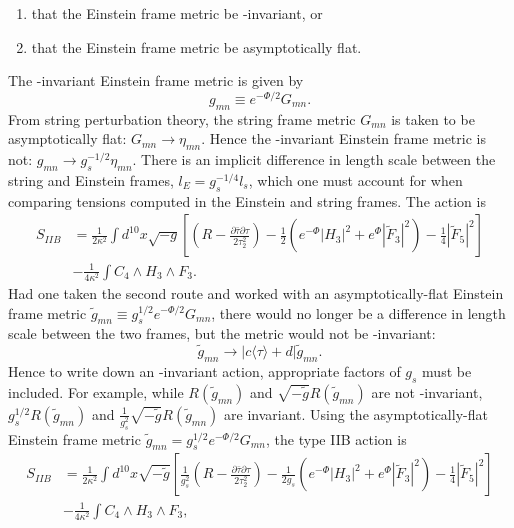 \begin{enumerate}
    \item that the Einstein frame metric be \SLR{}-invariant, or
    \item that the Einstein frame metric be asymptotically flat.
\end{enumerate}
The \SLR{}-invariant Einstein frame metric is given by
\begin{equation}
g_{mn} \equiv e^{-\Phi/2}G_{mn}.
\label{sl2r invariant Einstein frame metric}
\end{equation}
From string perturbation theory, the string frame metric $G_{mn}$ is taken to be asymptotically flat: $G_{mn} \to \eta_{mn}$. Hence the \SLR{}-invariant Einstein frame metric is not: $g_{mn} \to g_s^{-1/2}\eta_{mn}$.
There is an implicit difference in length scale between the string and Einstein frames, $l_E = g_s^{-1/4}l_s$, which one must account for when comparing tensions computed in the Einstein and string frames.
The action is
\begin{equation}
\begin{aligned}
S_{IIB}
&=\frac{1}{2\kappa^2} \int d^{10}x\sqrt{-g}\left[\left(R-\frac{\partial\bar\tau\partial\tau}{2\tau_2^2}\right)
-\frac{1}{2}\left(
e^{-\Phi}|H_3|^2+e^\Phi|\tilde{F}_3|^2
\right)
-\frac{1}{4}|\tilde F_5|^2
\right]\\
&-\frac{1}{4\kappa^2}\int C_4\wedge H_3\wedge F_3.
\end{aligned}
\label{eq:sl2r_invariant_einstein_frame_action}
\end{equation}
Had one taken the second route and worked with an asymptotically-flat Einstein frame metric $\tilde{g}_{mn} \equiv g_s^{1/2}e^{-\Phi/2}G_{mn}$, there would no longer be a difference in length scale between the two frames, but the metric would not be \SLR{}-invariant:
\begin{equation}
\tilde{g}_{mn} \to |c\langle\tau\rangle + d| \tilde{g}_{mn}.
\end{equation}
Hence to write down an \SLR{}-invariant action, appropriate factors of $g_s$ must be included. For example, while $R(\tilde{g}_{mn})$ and $\sqrt{-\tilde{g}} R(\tilde{g}_{mn})$ are not \SLR{}-invariant, 
$g_s^{1/2}R(\tilde{g}_{mn})$ and $\frac{1}{g_s^2}\sqrt{-\tilde{g}} R(\tilde{g}_{mn})$ are invariant.
Using the asymptotically-flat Einstein frame metric $\tilde{g}_{mn} = g_s^{1/2}e^{-\Phi/2}G_{mn}$, the type IIB action is
\begin{equation}
\begin{aligned}
S_{IIB}
&=\frac{1}{2\kappa^2} \int d^{10}x\sqrt{-\tilde{g}}\left[
\frac{1}{g_s^2}\left(R-\frac{\partial\bar\tau\partial\tau}{2\tau_2^2}\right)
-\frac{1}{2 g_s}\left(
e^{-\Phi}|H_3|^2+e^\Phi|\tilde{F}_3|^2
\right)
-\frac{1}{4}|\tilde F_5|^2
\right]\\
&-\frac{1}{4\kappa^2}\int C_4\wedge H_3\wedge F_3,
\end{aligned}
\label{eq:asymptotically_flat_einstein_frame_action}
\end{equation}
